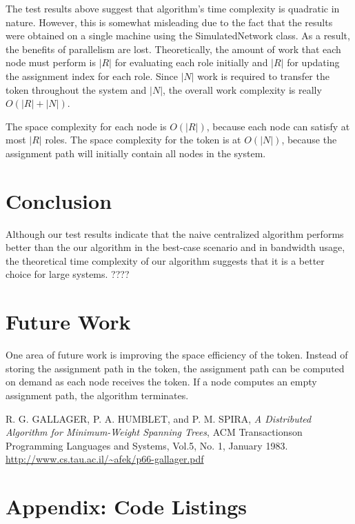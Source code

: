 \documentclass[11pt]{article}
\begin{document}
\begin{multicols}{2}
The test results above suggest that algorithm's time complexity is quadratic in nature. However, this is somewhat misleading due to the fact that the results were obtained on a single machine using the SimulatedNetwork class. As a result, the benefits of parallelism are lost. Theoretically, the amount of work that each node must perform is $|R|$ for evaluating each role initially and $|R|$ for updating the assignment index for each role. Since $|N|$ work is required to transfer the token throughout the system and $|N|$, the overall work complexity is really $O(|R| + |N|)$.

The space complexity for each node is $O(|R|)$, because each node can satisfy at most $|R|$ roles. The space complexity for the token is at $O(|N|)$, because the assignment path will initially contain all nodes in the system.

\section{Conclusion}
Although our test results indicate that the naive centralized algorithm performs better than the our algorithm in the best-case scenario and in bandwidth usage, the theoretical time complexity of our algorithm suggests that it is a better choice for large systems. ????

\section{Future Work}
One area of future work is improving the space efficiency of the token. Instead of storing the assignment path in the token, the assignment path can be computed on demand as each node receives the token. If a node computes an empty assignment path, the algorithm terminates.

\end{multicols}
\begin{thebibliography}{9}
  
  R. G. GALLAGER, P. A. HUMBLET, and P. M. SPIRA,
  \emph{A Distributed Algorithm for Minimum-Weight Spanning Trees},
  ACM Transactionson Programming Languages and Systems, Vol.5, No. 1, January 1983.
  \url{http://www.cs.tau.ac.il/~afek/p66-gallager.pdf}

\end{thebibliography}

\section{Appendix: Code Listings}
\appendix
\end{document}
